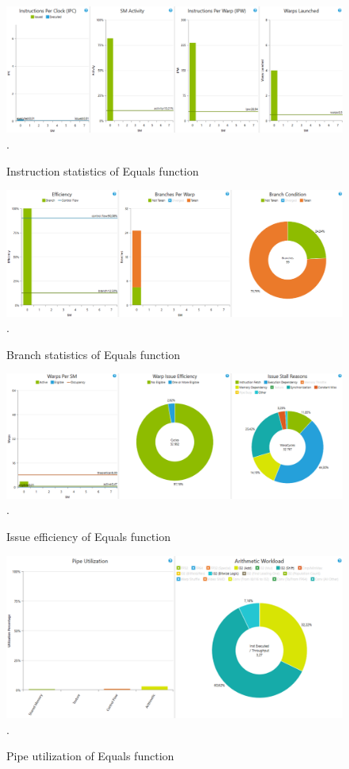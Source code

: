 \documentclass[oneside,openright,12pt,final,en]{mgr}
\begin{document}
\begin{figure}[H]
	\centering
	\includegraphics[width=\textwidth]{equals_instructions}.
	\caption{Instruction statistics of Equals function}
	\label{fig:equals_instructions}
\end{figure}

\begin{figure}[H]
	\centering
	\includegraphics[width=\textwidth]{equals_branch}.
	\caption{Branch statistics of Equals function}
	\label{fig:equals_branch}
\end{figure}

\begin{figure}[H]
	\centering
	\includegraphics[width=\textwidth]{equals_issue}.
	\caption{Issue efficiency of Equals function}
	\label{fig:equals_issue}
\end{figure}

\begin{figure}[H]
	\centering
	\includegraphics[width=\textwidth]{equals_pipe}.
	\caption{Pipe utilization of Equals function}
	\label{fig:equals_pipe}
\end{figure}
\end{document}
